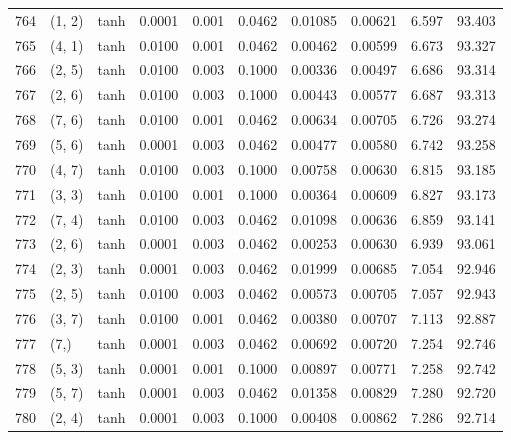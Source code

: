 \begin{tabular}{lllrrrrrrr}
764 &      (1, 2) &      tanh &  0.0001 &  0.001 &  0.0462 &          0.01085 &    0.00621 &       6.597 &    93.403 \\
765 &      (4, 1) &      tanh &  0.0100 &  0.001 &  0.0462 &          0.00462 &    0.00599 &       6.673 &    93.327 \\
766 &      (2, 5) &      tanh &  0.0100 &  0.003 &  0.1000 &          0.00336 &    0.00497 &       6.686 &    93.314 \\
767 &      (2, 6) &      tanh &  0.0100 &  0.003 &  0.1000 &          0.00443 &    0.00577 &       6.687 &    93.313 \\
768 &      (7, 6) &      tanh &  0.0100 &  0.001 &  0.0462 &          0.00634 &    0.00705 &       6.726 &    93.274 \\
769 &      (5, 6) &      tanh &  0.0001 &  0.003 &  0.0462 &          0.00477 &    0.00580 &       6.742 &    93.258 \\
770 &      (4, 7) &      tanh &  0.0100 &  0.003 &  0.1000 &          0.00758 &    0.00630 &       6.815 &    93.185 \\
771 &      (3, 3) &      tanh &  0.0100 &  0.001 &  0.1000 &          0.00364 &    0.00609 &       6.827 &    93.173 \\
772 &      (7, 4) &      tanh &  0.0100 &  0.003 &  0.0462 &          0.01098 &    0.00636 &       6.859 &    93.141 \\
773 &      (2, 6) &      tanh &  0.0001 &  0.003 &  0.0462 &          0.00253 &    0.00630 &       6.939 &    93.061 \\
774 &      (2, 3) &      tanh &  0.0001 &  0.003 &  0.0462 &          0.01999 &    0.00685 &       7.054 &    92.946 \\
775 &      (2, 5) &      tanh &  0.0100 &  0.003 &  0.0462 &          0.00573 &    0.00705 &       7.057 &    92.943 \\
776 &      (3, 7) &      tanh &  0.0100 &  0.001 &  0.0462 &          0.00380 &    0.00707 &       7.113 &    92.887 \\
777 &        (7,) &      tanh &  0.0001 &  0.003 &  0.0462 &          0.00692 &    0.00720 &       7.254 &    92.746 \\
778 &      (5, 3) &      tanh &  0.0001 &  0.001 &  0.1000 &          0.00897 &    0.00771 &       7.258 &    92.742 \\
779 &      (5, 7) &      tanh &  0.0001 &  0.003 &  0.0462 &          0.01358 &    0.00829 &       7.280 &    92.720 \\
780 &      (2, 4) &      tanh &  0.0001 &  0.003 &  0.1000 &          0.00408 &    0.00862 &       7.286 &    92.714 \\

\end{tabular}
